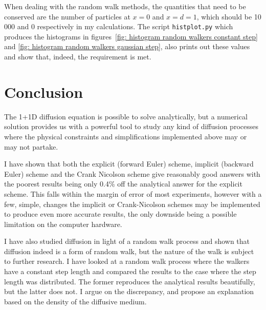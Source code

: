 \documentclass[twoside, 11pt]{article}
\begin{document}
		When dealing with the random walk methods, the quantities that need to be conserved are the number of particles at $x=0$ and $x=d=1$, which should be 10 000 and 0 respectively in my calculations. The script \texttt{histplot.py} which produces the histograms in figures~\ref{fig: histogram random walkers constant step} and \ref{fig: histogram random walkers gaussian step}, also prints out these values and show that, indeed, the requirement is met.
		
\section{Conclusion}
	The 1+1D diffusion equation is possible to solve analytically, but a numerical solution provides us with a powerful tool to study any kind of diffusion processes where the physical constraints and simplifications implemented above may or may not partake. 
	
	I have shown that both the explicit (forward Euler) scheme, implicit (backward Euler) scheme and the Crank Nicolson scheme give reasonably good answers with the poorest results being only 0.4\% off the analytical answer for the explicit scheme. This falls within the margin of error of most experiments, however with a few, simple, changes the implicit or Crank-Nicolson schemes may be implemented to produce even more accurate results, the only downside being a possible limitation on the computer hardware. 
	
	I have also studied diffusion in light of a random walk process and shown that diffusion indeed is a form of random walk, but the nature of the walk is subject to further research. I have looked at a random walk process where the walkers have a constant step length and compared the results to the case where the step length was distributed. The former reproduces the analytical results beautifully, but the latter does not. I argue on the discrepancy, and propose an explanation based on the density of the diffusive medium.






\end{document}
